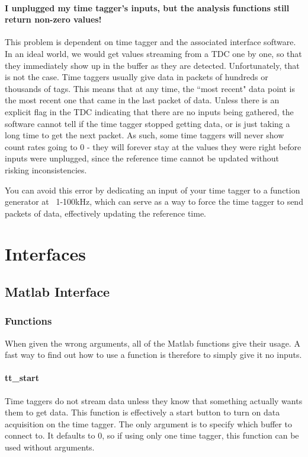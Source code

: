 \documentclass[10pt]{article}
\begin{document}
\paragraph{I unplugged my time tagger's inputs, but the analysis functions still return non-zero values!}

This problem is dependent on time tagger and the associated interface software. In an ideal world, we would get
values streaming from a TDC one by one, so that they immediately show up in the buffer as they are detected. 
Unfortunately, that is not the case. Time taggers usually give data in packets of hundreds or thousands of tags.
This means that at any time, the ``most recent" data point is the most recent one that came in the last packet of data.
Unless there is an explicit flag in the TDC indicating that there are no inputs being gathered, the software cannot
tell if the time tagger stopped getting data, or is just taking a long time to get the next packet. As such,
some time taggers will never show count rates going to 0 - they will forever stay at the values they were right
before inputs were unplugged, since the reference time cannot be updated without risking inconsistencies.

You can avoid this error by dedicating an input of your time tagger to a function generator at ~1-100kHz, which can
serve as a way to force the time tagger to send packets of data, effectively updating the reference time.

\section{Interfaces}

\subsection{Matlab Interface}
\subsubsection{Functions}

When given the wrong arguments, all of the Matlab functions give their usage. A fast way to find out
how to use a function is therefore to simply give it no inputs.

\paragraph{tt\_start}
Time taggers do not stream data unless they know that something actually wants them to get data.
This function is effectively a start button to turn on data acquisition on the time tagger. The only
argument is to specify which buffer to connect to. It defaults to 0, so if using only one time tagger,
this function can be used without arguments.
\end{document}
